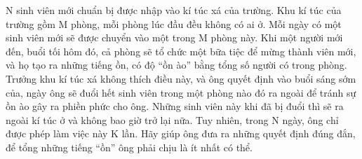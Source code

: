 N sinh viên mới chuẩn bị được nhập vào kí túc xá của trường. Khu kí túc của trường gồm M phòng, mỗi phòng lúc đầu đều không có ai ở. Mỗi ngày có một sinh viên mới sẽ được chuyển vào một trong M phòng này. Khi một người mới đến, buổi tối hôm đó, cả phòng sẽ tổ chức một bữa tiệc để mừng thành viên mới, và họ tạo ra những tiếng ồn, có độ “ồn ào” bằng tổng số người có trong phòng. Trưởng khu kí túc xá không thích điều này, và ông quyết định vào buổi sáng sớm của, ngày ông sẽ đuổi hết sinh viên trong một phòng nào đó ra ngoài để tránh sự ồn ào gây ra phiền phức cho ông. Những sinh viên này khi đã bị đuổi thì sẽ ra ngoài kí túc ở và không bao giờ trở lại nữa. Tuy nhiên, trong N ngày, ông chỉ được phép làm việc này K lần. Hãy giúp ông đưa ra những quyết định đúng đắn, để tổng những tiếng “ồn” ông phải chịu là ít nhất có thể.